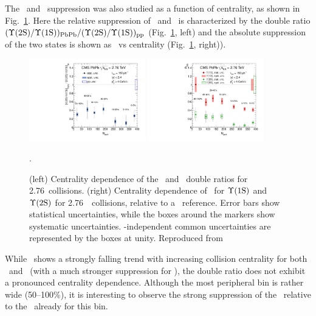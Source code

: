 The \PgUa\ and \PgUb\ suppression was also studied as a function of centrality,
as shown in Fig.~\ref{fig:GR:centrality}.
Here the relative suppression of \PgUa\ and \PgUb\ is characterized by
the double ratio \linebreak $({\Upsilon\mathrm{(2S)}/\Upsilon\mathrm{(1S)}})_{\rm PbPb}/({\Upsilon\mathrm{(2S)}/\Upsilon\mathrm{(1S)}})_{\rm pp}$
(Fig.~\ref{fig:GR:centrality}, left) and the absolute suppression
of the two states is shown as \Raa\ vs centrality (Fig.~\ref{fig:GR:centrality}, right)).

\begin{figure}[t]
\begin{center}
   \includegraphics[width=0.45\textwidth]{qqbarfigures/chi2VsCent}
   \includegraphics[width=0.45\textwidth]{qqbarfigures/RaaPt4}
  \caption{(left) Centrality dependence of the \PgUa\ and \PgUb\ double ratios
for 2.76\TeV\ collisions.  (right) Centrality dependence of \Raa\
for $\Upsilon\mathrm{(1S)}$ and $\Upsilon\mathrm{(2S)}$ for 2.76\TeV\ \PbPb\ collisions, relative to a \pp\ reference.
Error bars show statistical uncertainties, while the boxes around the markers
show systematic uncertainties. \npart-independent
common uncertainties are represented by the boxes at unity. Reproduced from~\cite{Chatrchyan:2012lxa}}.
\label{fig:GR:centrality}
\end{center}
\end{figure}

While \Raa\ shows a strongly falling trend with increasing collision centrality
for both \PgUa\ and \PgUb\ (with a much stronger suppression for \PgUb), the
double ratio does not exhibit a pronounced centrality dependence.
Although the most peripheral bin
is rather wide (50--100\%), it is interesting to observe the strong suppression of the
\PgUb\ relative to the \PgUa\ already for this bin.



